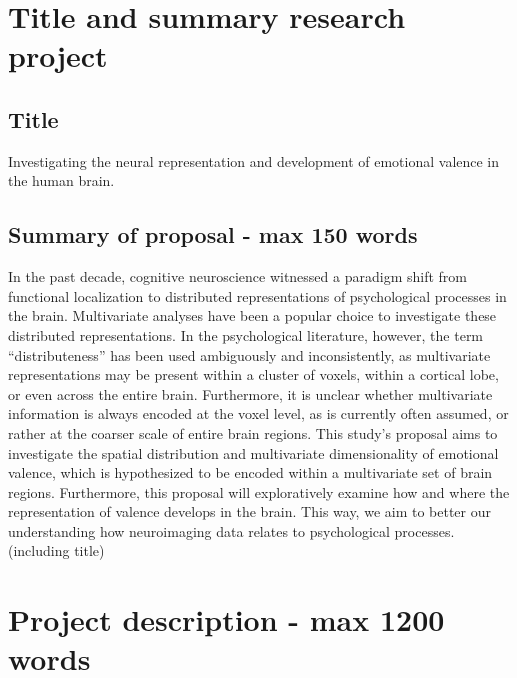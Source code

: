 \documentclass[12pt,a4paper]{article}\usepackage[]{graphicx}\usepackage[]{color}
\begin{document}
\section{Title and summary research project}

\subsection{Title}
Investigating the neural representation and development of emotional valence in the human brain.

\subsection{Summary of proposal \textmd{- max 150 words}}
In the past decade, cognitive neuroscience witnessed a paradigm shift from functional localization to distributed representations of psychological processes in the brain. Multivariate analyses have been a popular choice to investigate these distributed representations. In the psychological literature, however, the term ``distributeness'' has been used ambiguously and inconsistently, as multivariate representations may be present within a cluster of voxels, within a cortical lobe, or even across the entire brain. Furthermore, it is unclear whether multivariate information is always encoded at the voxel level, as is currently often assumed, or rather at the coarser scale of entire brain regions. This study's proposal aims to investigate the spatial distribution and multivariate dimensionality of emotional valence, which is hypothesized to be encoded within a multivariate set of brain regions. Furthermore, this proposal will exploratively examine how and where the representation of valence develops in the brain. This way, we aim to better our understanding how neuroimaging data relates to psychological processes. \\

\noindent
\wordcount (including title)

\section{Project description \textmd{- max 1200 words}}
\end{document}
